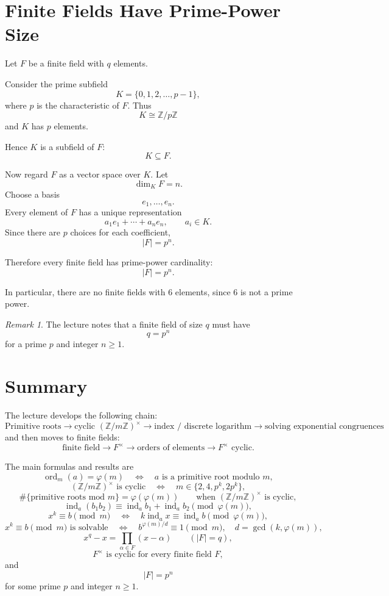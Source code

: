 \documentclass[11pt]{article}
\theoremstyle{remark}
\newtheorem*{remark}{Remark}
\DeclareMathOperator{\gcdop}{gcd}
\DeclareMathOperator{\ord}{ord}
\DeclareMathOperator{\ind}{ind}
\newcommand{\Z}{\mathbb Z}
\newcommand{\phiE}{\varphi}
\newcommand{\units}[1]{\left(\mathbb Z/#1\mathbb Z\right)^\times}
\begin{document}
\section{Finite Fields Have Prime-Power Size}

Let $F$ be a finite field with $q$ elements.

Consider the prime subfield
\[
    K=\{0,1,2,\ldots,p-1\},
\]
where $p$ is the characteristic of $F$. Thus
\[
    K\cong\Z/p\Z
\]
and $K$ has $p$ elements.

Hence $K$ is a subfield of $F$:
\[
    K\subseteq F.
\]

Now regard $F$ as a vector space over $K$. Let
\[
    \dim_KF=n.
\]
Choose a basis
\[
    e_1,\ldots,e_n.
\]
Every element of $F$ has a unique representation
\[
    a_1e_1+\cdots+a_ne_n,
    \qquad
    a_i\in K.
\]
Since there are $p$ choices for each coefficient,
\[
    |F|=p^n.
\]

Therefore every finite field has prime-power cardinality:
\[
    \boxed{|F|=p^n.}
\]

In particular, there are no finite fields with $6$ elements, since $6$ is
not a prime power.

\begin{remark}
The lecture notes that a finite field of size $q$ must have
\[
    q=p^n
\]
for a prime $p$ and integer $n\ge1$.
\end{remark}

\section*{Summary}

The lecture develops the following chain:
\[
\boxed{
\text{Primitive roots}
\longrightarrow
\text{cyclic }\units m
\longrightarrow
\text{index / discrete logarithm}
\longrightarrow
\text{solving exponential congruences}
}
\]
and then moves to finite fields:
\[
\boxed{
\text{finite field}
\longrightarrow
F^\times
\longrightarrow
\text{orders of elements}
\longrightarrow
F^\times\text{ cyclic}
}.
\]

The main formulas and results are
\[
    \ord_m(a)=\phiE(m)
    \quad\Longleftrightarrow\quad
    a\text{ is a primitive root modulo }m,
\]
\[
    \units m\text{ is cyclic}
    \quad\Longleftrightarrow\quad
    m\in\{2,4,p^k,2p^k\},
\]
\[
    \#\{\text{primitive roots mod }m\}
    =
    \phiE(\phiE(m))
    \qquad
    \text{when }\units m\text{ is cyclic},
\]
\[
    \ind_a(b_1b_2)
    \equiv
    \ind_a b_1+\ind_a b_2
    \pmod{\phiE(m)},
\]
\[
    x^k\equiv b\pmod m
    \quad\Longleftrightarrow\quad
    k\ind_a x\equiv\ind_a b
    \pmod{\phiE(m)},
\]
\[
    x^k\equiv b\pmod m
    \text{ is solvable}
    \quad\Longleftrightarrow\quad
    b^{\phiE(m)/d}\equiv1\pmod m,
    \quad
    d=\gcdop(k,\phiE(m)),
\]
\[
    x^q-x
    =
    \prod_{\alpha\in F}(x-\alpha)
    \qquad(|F|=q),
\]
\[
    \boxed{F^\times\text{ is cyclic for every finite field }F},
\]
and
\[
    \boxed{|F|=p^n}
\]
for some prime $p$ and integer $n\ge1$.
\end{document}
